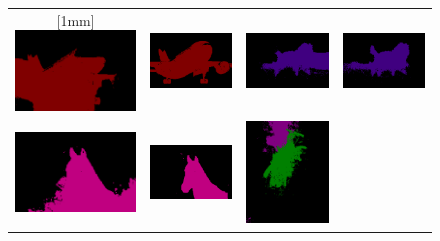 \begin{figure}[thbp]
{\begin{tabular}{c c c c}
        [1mm]
        \includegraphics[width=0.18\linewidth, height=0.18\linewidth]{figures/ablation/withoutrfm/2011_001753_[0]} &
        \includegraphics[width=0.18\linewidth, height=0.18\linewidth]{figures/ablation/withrfm/2011_001753_[0]} & \hspace{2pt}
        \includegraphics[width=0.18\linewidth, height=0.18\linewidth]{figures/ablation/withoutrfm/2011_002398_[11]} &
        \includegraphics[width=0.18\linewidth, height=0.18\linewidth]{figures/ablation/withrfm/2011_002398_[11]} \\
        [1mm]
        \includegraphics[width=0.18\linewidth, height=0.18\linewidth]{figures/ablation/withoutrfm/2007_009807_[12]} &
        \includegraphics[width=0.18\linewidth, height=0.18\linewidth]{figures/ablation/withrfm/2007_009807_[12]} & \hspace{2pt}
        \includegraphics[width=0.18\linewidth, height=0.18\linewidth]{figures/ablation/withoutrfm/2010_003912_[1, 4]} &

\end{tabular}}
\end{figure}
